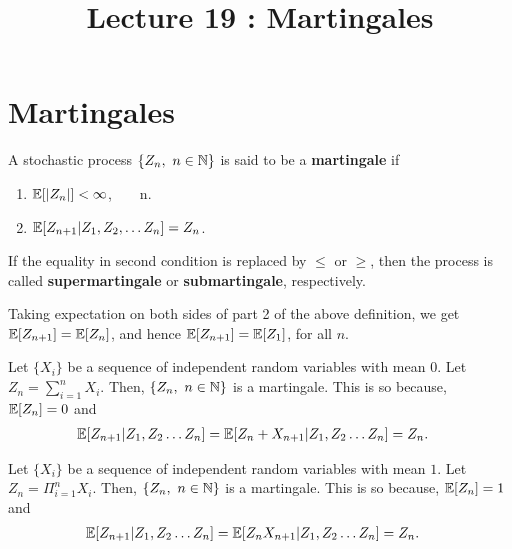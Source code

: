 \documentclass[a4paper,10pt,english]{article}
\title{Lecture 19 : Martingales}
\author{}
\begin{document}
\maketitle
\section{Martingales}
\begin{defn}
A stochastic process $\{Z_n,~n \in \mathbb{N} \}$ is said to be a \textbf{martingale} if 
\begin{enumerate}
\item $\mathbb{E}[|Z_n|]< \infty$, ~ ~ n.
\item $\mathbb{E}[Z_{n+1}|Z_1,Z_2, \hdots Z_n]=Z_n$.
\end{enumerate}
If the equality in second condition is replaced by $\leq$ or $\geq$, then the process is called \textbf{supermartingale} or \textbf{submartingale}, respectively.
\end{defn}
\begin{rem} Taking expectation on both sides of part 2 of the above definition, we get $\mathbb{E}[Z_{n+1}]=\mathbb{E}[Z_n]$, and hence $\mathbb{E}[Z_{n+1}]=\mathbb{E}[Z_1]$, for all $n$.
\end{rem}
\begin{exmp}
Let $\{X_i\}$ be a sequence of independent random variables with mean $0$. Let $Z_n=\sum_{i=1}^n X_i$. Then, $\{Z_n,~n \in \mathbb{N} \}$ is a martingale. This is so because, $\mathbb{E}[Z_n]=0$ and 
\begin{align*}
\mathbb{E}[Z_{n+1}|Z_1,Z_2 \hdots Z_n] =\mathbb{E}[Z_{n}+X_{n+1}|Z_1,Z_2 \hdots Z_n]
&=Z_n.
\end{align*} 
\end{exmp}
\begin{exmp}
Let $\{X_i\}$ be a sequence of independent random variables with mean $1$. Let $Z_n=\Pi_{i=1}^n X_i$. Then, $\{Z_n,~n \in \mathbb{N} \}$ is a martingale. This is so because, $\mathbb{E}[Z_n]=1$ and 
\begin{align*}
\mathbb{E}[Z_{n+1}|Z_1,Z_2 \hdots Z_n] =\mathbb{E}[Z_{n}X_{n+1}|Z_1,Z_2 \hdots Z_n]
&=Z_n.
\end{align*} 
\end{exmp}
\end{document}
